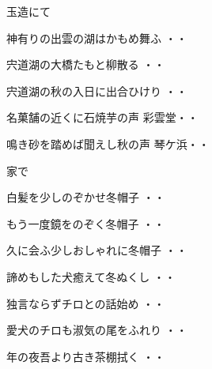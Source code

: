 \vspace{0.4cm}
玉造にて
\begin{shiika}神有りの出雲の湖はかもめ舞ふ
\hfill{・・}\end{shiika}
\begin{shiika}宍道湖の大橋たもと柳散る
\hfill{・・}\end{shiika}
\begin{shiika}宍道湖の秋の入日に出合ひけり
\hfill{・・}\end{shiika}
\begin{shiika}名菓舗の近くに石焼芋の声
彩雲堂\hfill{・・}\end{shiika}
\begin{shiika}鳴き砂を踏めば聞えし秋の声
琴ケ浜\hfill{・・}\end{shiika}
\vspace{0.4cm}
家で
\begin{shiika}白髪を少しのぞかせ冬帽子
\hfill{・・}\end{shiika}
\vspace{0.4cm}
\begin{shiika}もう一度鏡をのぞく冬帽子
\hfill{・・}\end{shiika}
\vspace{0.4cm}
\begin{shiika}久に会ふ少しおしゃれに冬帽子
\hfill{・・}\end{shiika}
\vspace{0.4cm}
\begin{shiika}諦めもした犬癒えて冬ぬくし
\hfill{・・}\end{shiika}
\vspace{0.4cm}
\begin{shiika}独言ならずチロとの話始め
\hfill{・・}\end{shiika}
\vspace{0.4cm}
\begin{shiika}愛犬のチロも淑気の尾をふれり
\hfill{・・}\end{shiika}
\vspace{0.4cm}
\begin{shiika}年の夜吾より古き茶棚拭く
\hfill{・・}\end{shiika}
